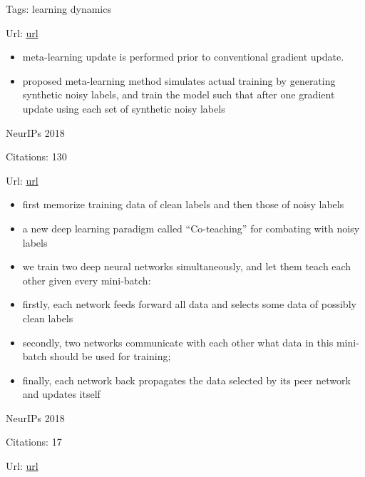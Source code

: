 \documentclass[11pt]{article}
\begin{document}
\noindent Tags: learning dynamics

\noindent Url: \href{https://arxiv.org/pdf/1812.05214.pdf}{url}

\begin{itemize}
  \item meta-learning update is performed prior to conventional gradient update.
  \item proposed meta-learning method simulates actual training by generating synthetic noisy labels, and train the model such that after one gradient update using each set of synthetic noisy labels
\end{itemize}

\vspace{2cm}

\noindent NeurIPs 2018

\noindent Citations: 130

\noindent Url: \href{https://arxiv.org/pdf/1804.06872.pdf}{url}

\begin{itemize}
\item first memorize training data of clean labels and then those of noisy labels
\item a new deep learning paradigm called “Co-teaching” for combating with noisy labels
\item we train two deep neural networks simultaneously, and let them teach each other given every mini-batch:
\item firstly, each network feeds forward all data and selects some data of possibly clean labels
\item  secondly, two networks communicate with each other what data in this mini-batch should be used for training;
\item finally, each network back propagates the data selected by its peer network and updates itself
\end{itemize}

\vspace{2cm}

\noindent NeurIPs 2018

\noindent Citations: 17

\noindent Url: \href{https://papers.nips.cc/paper/8229-robustness-of-conditional-gans-to-noisy-labels.pdf}{url}
\end{document}
